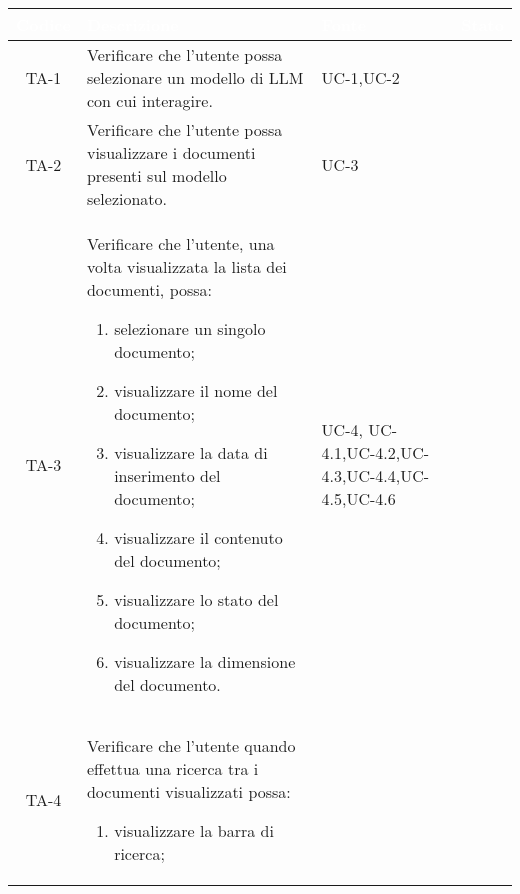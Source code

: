 \begingroup
\setlength{\tabcolsep}{10pt}
\renewcommand{\arraystretch}{1.5}
\begin{xltabular}{\textwidth}{| c | X | X | c |}
    \hline
     \textbf{\textcolor{white}{Codice}} & \textbf{\textcolor{white}{Descrizione}} & \textbf{\textcolor{white}{Fonte}} & \textbf{\textcolor{white}{Stato}}\\
    \hline
    \endhead
    \hline
    
    TA-1 & Verificare che l’utente possa selezionare un modello di LLM con cui interagire. & UC-1,\newline UC-2 & \textcolor{xmarkcolor}{}  \\
    \hline
    TA-2 & Verificare che l’utente possa visualizzare i documenti presenti sul modello selezionato.
     & UC-3 &\textcolor{xmarkcolor}{}  \\
    \hline
    TA-3 & Verificare che l’utente, una volta visualizzata la lista dei documenti, possa: \begin{enumerate}
        \item selezionare un singolo documento;
        \item visualizzare il nome del documento;
        \item visualizzare la data di inserimento del documento;
        \item visualizzare il contenuto del documento;
        \item visualizzare lo stato del documento;
        \item visualizzare la dimensione del documento.
    \end{enumerate} & UC-4, \newline UC-4.1,\newline UC-4.2,\newline UC-4.3,\newline UC-4.4,\newline UC-4.5,\newline UC-4.6 & \textcolor{xmarkcolor}{}  \\
    \hline
    TA-4 & Verificare che l’utente quando effettua una ricerca tra i documenti visualizzati possa:
    \begin{enumerate}
        \item visualizzare la barra di ricerca;

\end{enumerate}
\end{xltabular}
